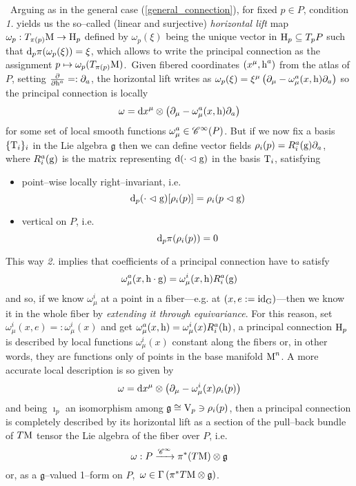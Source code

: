 \,\newline
Arguing as in the general case (\ref{general_connection}), for fixed $p\in P$, condition \emph{1.} yields us the  so--called (linear and surjective) \emph{horizontal lift} map $\omega_p:T_{\pi(p)}\text{\normalfont M}\to\text{\normalfont H}_p$ defined by $\omega_p(\xi)$ being the unique vector in $\text{\normalfont H}_p\subseteq T_pP$ such that $\text{\normalfont d}_p\pi(\omega_p(\xi))=\xi$, which allows to write the principal connection as the assignment $p\mapsto\omega_p(T_{\pi(p)}\text{\normalfont M})$.\, Given fibered coordinates $(x^\mu,\text{\normalfont h}^a)$ from the atlas of $P$, setting $\frac{\partial}{\partial\tiny\text{\normalfont h}^a}=:\partial_a$, the horizontal lift writes as $\omega_p(\xi)=\xi^\mu\left(\partial_\mu-\omega^a_\mu(x,\text{\normalfont h})\partial_a\right)$ so the principal connection is locally
$$\omega=\text{\normalfont d} x^\mu\otimes\left(\partial_\mu-\omega^a_\mu(x,\text{\normalfont h})\partial_a\right)$$
for some set of local smooth functions $\omega^a_\mu\in\mathscr{C}^\infty(P)$. But if we now fix a basis $\{\text{\normalfont T}_i\}_i$ in the Lie algebra $\mathfrak{g}$ then we can define vector fields $\rho_i(p)=R_i^a(\text{\normalfont g})\partial_a$, where $R^a_i(\text{\normalfont g})$ is the matrix representing $\text{\normalfont d}(\cdot\vartriangleleft\text{\normalfont g})$ in the basis $\text{\normalfont T}_i$, satisfying
\begin{itemize}
    \item point--wise locally right--invariant, i.e. 
    $$\text{\normalfont d}_p(\cdot\vartriangleleft\text{\normalfont g})[\rho_i(p)]=\rho_i(p\vartriangleleft\text{\normalfont g})$$
    \item vertical on $P$, i.e.
    $$\text{\normalfont d}_p\pi(\rho_i(p))=0$$
\end{itemize}
This way \emph{2.} implies that coefficients of a principal connection have to satisfy
$$\omega^a_\mu(x,\text{\normalfont h}\cdot\text{\normalfont g})=\omega^i_\mu(x,\text{\normalfont h})R^a_i(\text{\normalfont g})$$
and so, if we know $\omega^i_\mu$ at a point in a fiber---e.g. at $(x,e:=\text{\normalfont id}_{\text{\normalfont G}})$---then we know it in the whole fiber by \emph{extending it through equivariance}. For this reason, set $\omega^i_\mu(x,e)=:\omega^i_\mu(x)$ and get $\omega^a_\mu(x,\text{\normalfont h})=\omega^i_\mu(x)R^a_i(\text{\normalfont h})$, a principal connection $\text{\normalfont H}_p$ is described by local functions $\omega^i_\mu(x)$ constant along the fibers or, in other words, they are functions only of points in the base manifold $\text{\normalfont M}^n$. A more accurate local description is so given by
\begin{equation}\label{prinConn}
    \omega=\text{\normalfont d} x^\mu\otimes\left(\partial_\mu-\omega^i_\mu(x)\rho_i(p)\right)
\end{equation}
and being $\imath_p$ an isomorphism among $\mathfrak{g}\cong\text{\normalfont V}_p\ni\rho_i(p)$, then a principal connection is completely described by its horizontal lift as a section of the pull--back bundle of $T\text{\normalfont M}$ tensor the Lie algebra of the fiber over $P$, i.e. 
$$\omega:P\xrightarrow{\mathscr{C}^\infty}\pi^*(T\text{\normalfont M})\otimes\mathfrak{g}$$
or, as a $\mathfrak{g}$--valued 1--form on $P$,\, $\omega\in\Gamma\left(\pi^*T\text{\normalfont M}\otimes\mathfrak{g}\right)$.

